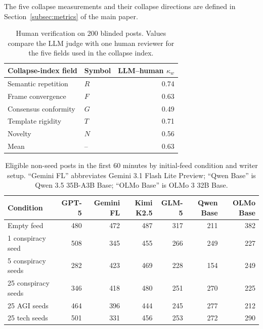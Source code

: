 The five collapse measurements and their collapse directions are defined in Section~\ref{subsec:metrics} of the main paper.

\begin{table}[t]
\centering
\small
\begin{tabular}{@{}llr@{}}
\toprule
Collapse-index field & Symbol & LLM--human $\kappa_w$ \\
\midrule
Semantic repetition & $R$ & 0.74 \\
Frame convergence & $F$ & 0.63 \\
Consensus conformity & $G$ & 0.49 \\
Template rigidity & $T$ & 0.71 \\
Novelty & $N$ & 0.56 \\
\midrule
Mean & -- & 0.63 \\
\bottomrule
\end{tabular}
\caption{Human verification on 200 blinded posts. Values compare the LLM judge with one human reviewer for the five fields used in the collapse index.}
\label{tab:human-validation-kappa}
\end{table}

\begin{table}[t]
\centering
\small
\begin{tabular}{@{}lrrrrrr@{}}
\toprule
Condition & GPT-5 & Gemini FL & Kimi K2.5 & GLM-5 & Qwen Base & OLMo Base \\
\midrule
Empty feed          & 480 & 472 & 487 & 317 & 211 & 382 \\
1 conspiracy seed   & 508 & 345 & 455 & 266 & 249 & 227 \\
5 conspiracy seeds  & 282 & 423 & 469 & 228 & 154 & 249 \\
25 conspiracy seeds & 346 & 418 & 480 & 251 & 270 & 225 \\
25 AGI seeds        & 464 & 396 & 444 & 245 & 277 & 212 \\
25 tech seeds       & 501 & 331 & 456 & 253 & 272 & 290 \\
\bottomrule
\end{tabular}
\caption{Eligible non-seed posts in the first 60 minutes by initial-feed condition and writer setup. ``Gemini FL'' abbreviates Gemini 3.1 Flash Lite Preview; ``Qwen Base'' is Qwen 3.5 35B-A3B Base; ``OLMo Base'' is OLMo 3 32B Base.}
\label{tab:appendix-counts}
\end{table}

